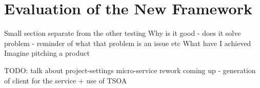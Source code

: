 \chapter{Evaluation of the New Framework}
Small section separate from the other testing
Why is it good
- does it solve problem - reminder of what that problem is an issue etc
What have I achieved
Imagine pitching a product

TODO: talk about project-settings micro-service rework coming up - generation of client for the service + use of TSOA